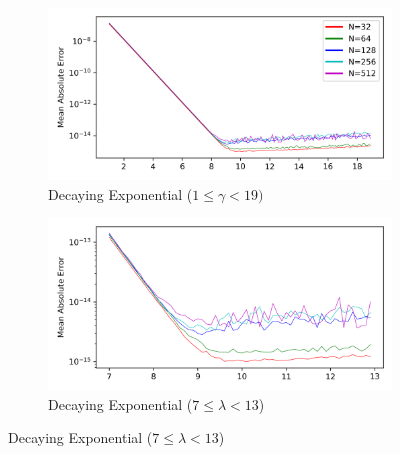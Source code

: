 \documentclass[a4paper]{report}
\begin{document}
\begin{figure}[H]
    \begin{subfigure}{.45\linewidth}
      \includegraphics[width=\linewidth]{images/cavers/decay_exp.png}
      \caption{Decaying Exponential ($1 \leq \gamma < 19)$}
    \end{subfigure}\hfill
    \begin{subfigure}{.45\linewidth}
      \includegraphics[width=\linewidth]{images/cavers/decay_exp_zoomed.png}
      \caption{Decaying Exponential ($7 \leq \lambda < 13$)}
    \end{subfigure}
    
    \medskip
    

\end{figure}
\end{document}
